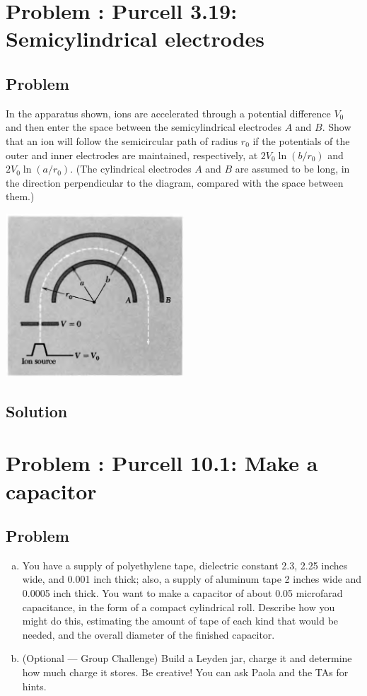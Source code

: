 \documentclass[solutions]{esg8022pset}
\begin{document}
\section{Problem \thesection: Purcell 3.19: Semicylindrical electrodes}
\subsection{Problem}
  In the apparatus shown, ions are accelerated through a potential difference $V_0$ and then enter the space between the semicylindrical electrodes $A$ and $B$. Show that an ion will follow the semicircular path of radius $r_0$ if the potentials of the outer and inner electrodes are maintained, respectively, at $2V_0\ln(b/r_0)$ and $2V_0\ln(a/r_0)$. (The cylindrical electrodes $A$ and $B$ are assumed to be long, in the direction perpendicular to the diagram, compared with the space between them.)
  \begin{center}\includegraphics[width=0.5\textwidth]{ps04_06}\end{center}
\subsection{Solution}

\section{Problem \thesection: Purcell 10.1: Make a capacitor}
\subsection{Problem}
  \begin{enumerate}[(a)]
    \item You have a supply of polyethylene tape, dielectric constant
      2.3, 2.25 inches wide, and 0.001 inch thick; also, a supply of aluminum
      tape 2 inches wide and 0.0005 inch thick. You want to make a capacitor
      of about 0.05 microfarad capacitance, in the form of a compact
      cylindrical roll. Describe how you might do this, estimating the
      amount of tape of each kind that would be needed, and the overall
      diameter of the finished capacitor.
    \item (Optional --- Group Challenge) Build a Leyden jar, charge it
      and determine how much charge it stores. Be creative!  You can ask
      Paola and the TAs for hints.
  \end{enumerate}
\end{document}
